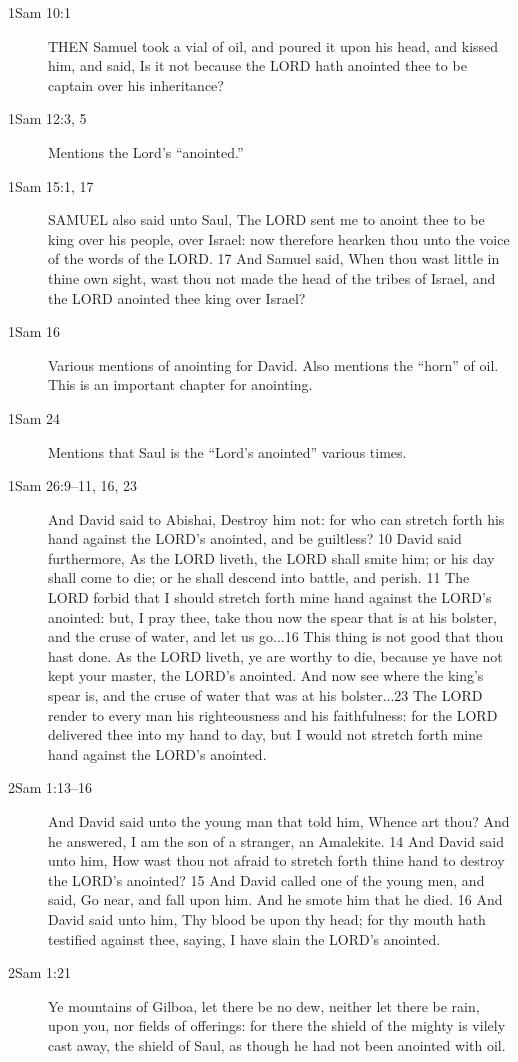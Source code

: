 \begin{description}
		\item[1Sam 10:1] THEN Samuel took a vial of oil, and poured it upon his head, and kissed him, and said, Is it not because the LORD hath anointed thee to be captain over his inheritance?
		\item[1Sam 12:3, 5] Mentions the Lord's ``anointed.''
		\item[1Sam 15:1, 17] SAMUEL also said unto Saul, The LORD sent me to anoint thee to be king over his people, over Israel: now therefore hearken thou unto the voice of the words of the LORD. 17 And Samuel said, When thou wast little in thine own sight, wast thou not made the head of the tribes of Israel, and the LORD anointed thee king over Israel?
		\item[1Sam 16] Various mentions of anointing for David. Also mentions the ``horn'' of oil. This is an important chapter for anointing.
		\item[1Sam 24] Mentions that Saul is the ``Lord's anointed'' various times.
		\item[1Sam 26:9--11, 16, 23] And David said to Abishai, Destroy him not: for who can stretch forth his hand against the LORD's anointed, and be guiltless? 10 David said furthermore, As the LORD liveth, the LORD shall smite him; or his day shall come to die; or he shall descend into battle, and perish. 11 The LORD forbid that I should stretch forth mine hand against the LORD's anointed: but, I pray thee, take thou now the spear that is at his bolster, and the cruse of water, and let us go...16 This thing is not good that thou hast done. As the LORD liveth, ye are worthy to die, because ye have not kept your master, the LORD's anointed. And now see where the king's spear is, and the cruse of water that was at his bolster...23 The LORD render to every man his righteousness and his faithfulness: for the LORD delivered thee into my hand to day, but I would not stretch forth mine hand against the LORD's anointed.
		\item[2Sam 1:13--16] And David said unto the young man that told him, Whence art thou? And he answered, I am the son of a stranger, an Amalekite. 14 And David said unto him, How wast thou not afraid to stretch forth thine hand to destroy the LORD's anointed? 15 And David called one of the young men, and said, Go near, and fall upon him. And he smote him that he died. 16 And David said unto him, Thy blood be upon thy head; for thy mouth hath testified against thee, saying, I have slain the LORD's anointed.
		\item[2Sam 1:21] Ye mountains of Gilboa, let there be no dew, neither let there be rain, upon you, nor fields of offerings: for there the shield of the mighty is vilely cast away, the shield of Saul, as though he had not been anointed with oil.

\end{description}

